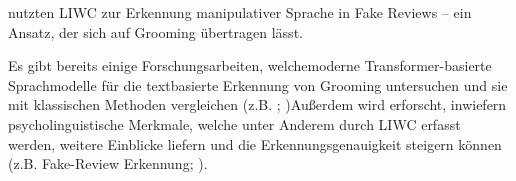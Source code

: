  \parencite{salminen2025fakereviews} nutzten LIWC zur Erkennung manipulativer Sprache in Fake Reviews -- ein Ansatz, der sich auf Grooming übertragen lässt.

Es gibt bereits einige Forschungsarbeiten, welchemoderne Transformer-basierte Sprachmodelle für die textbasierte Erkennung von Grooming untersuchen und sie mit klassischen Methoden vergleichen (z.B.  \cite{street2024grooming}; \cite{leiva2025meta})Außerdem wird erforscht, inwiefern psycholinguistische Merkmale, welche unter Anderem durch LIWC erfasst werden, weitere Einblicke liefern und die Erkennungsgenauigkeit steigern können (z.B. Fake-Review Erkennung; \cite{salminen2025fakereviews}). 


\begin{comment}
    First, high-level features are crucial for detecting online grooming, including emotional markers, fixated discourse, and deceptive behavior, significantly improving accuracy in distinguishing grooming from other interactions (Ashcroft et al., 2015; Bogdanova et al., 2014; Kim et al., 2020). Computational research trends show a shift toward deep learning-based models, particularly recurrent neural networks (RNNs) and transformer architectures, which process sequential chat data with better contextual understanding.  \cite{an2025cybergrooming}
\end{comment}



